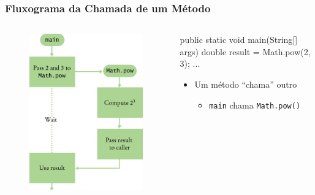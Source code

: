 \documentclass[xcolor={dvipsnames,table},aspectratio=169]{beamer}
\begin{document}
\begin{frame}[fragile]\frametitle{Fluxograma da Chamada de um Método}
\begin{columns}[T]
	\begin{column}{0.5\linewidth}
\begin{figure}[h]
	\includegraphics[height=0.65\paperheight,center]{pucrs-ep-fprog-unidade_05-metodos-laminas-fluxograma_metodo.png}
\end{figure}
	\end{column}
	\begin{column}{0.5\linewidth}
{\scriptsize
\begin{javacode}
public static void main(String[] args) {
  double result = Math.pow(2, 3);
  ...
}
\end{javacode}
}
		\begin{itemize}
			\item Um método ``chama'' outro
			\begin{itemize}
				\item \texttt{main} chama \texttt{Math.pow()}

\end{itemize}
\end{itemize}
\end{column}
\end{columns}
\end{frame}
\end{document}
